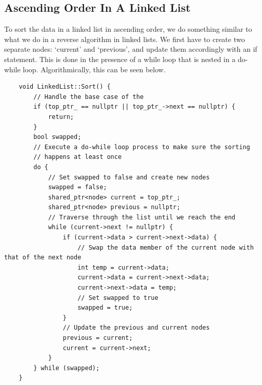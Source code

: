 \documentclass[a4paper,9pt]{article}
\begin{document}
\subsection*{Ascending Order In A Linked List}

To sort the data in a linked list in ascending order, we do something similar to what we do in a reverse 
algorithm in 
linked lists. We first have to create two separate nodes: `current' and `previous', and update them 
accordingly with an
if statement. This is done in the presence of a while loop that is nested in a do-while loop. 
Algorithmically, this can
be seen below.

\begin{highlight}
    \begin{verbatim}
    void LinkedList::Sort() {
        // Handle the base case of the 
        if (top_ptr_ == nullptr || top_ptr_->next == nullptr) {
            return;
        }
        bool swapped;
        // Execute a do-while loop process to make sure the sorting
        // happens at least once
        do {
            // Set swapped to false and create new nodes
            swapped = false;
            shared_ptr<node> current = top_ptr_;
            shared_ptr<node> previous = nullptr;
            // Traverse through the list until we reach the end
            while (current->next != nullptr) {
                if (current->data > current->next->data) {
                    // Swap the data member of the current node with that of the next node
                    int temp = current->data;
                    current->data = current->next->data;
                    current->next->data = temp;
                    // Set swapped to true
                    swapped = true;
                }
                // Update the previous and current nodes
                previous = current;
                current = current->next;
            }
        } while (swapped);
    }        
    \end{verbatim}
\end{highlight}
\end{document}
